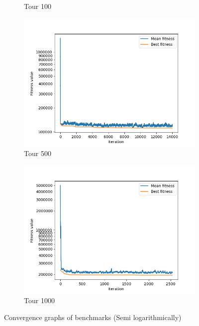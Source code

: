 \documentclass[a4paper,10pt]{article}
\begin{document}
\begin{figure}[H]
\begin{subfigure}[b]{0.40\linewidth}
      \caption{Tour 100}
      \label{fig:tour_100}
    \end{subfigure}
    \begin{subfigure}[b]{0.40\linewidth}
          \includegraphics[width=\linewidth]{tour_500_28_12_2021_20_20.png}
      \caption{Tour 500}
      \label{fig:tour_500}
    \end{subfigure}
    \begin{subfigure}[b]{0.40\linewidth}
          \includegraphics[width=\linewidth]{tour_1000_28_12_2021_20_40.png}
      \caption{Tour 1000}
      \label{fig:tour_1000}
    \end{subfigure}
    \caption{Convergence graphs of benchmarks (Semi logarithmically)}
    \label{fig:convergence_graphs}
  \end{figure}
\end{document}
